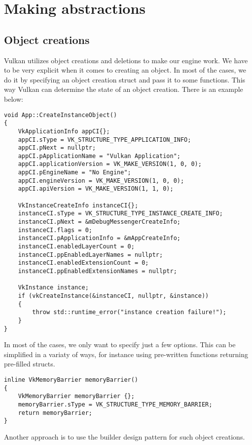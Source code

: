 \documentclass[12pt]{article}
\begin{document}
	\newpage
	\section{Making abstractions}
	\subsection{Object creations}
	Vulkan utilizes object creations and deletions to make our engine work. We have to be very explicit when it comes to creating an object. In most of the cases, we do it by specifying an object creation struct and pass it to some functions. This way Vulkan can determine the state of an object creation. There is an example below:
	\begin{lstlisting}[style=customcpp]
void App::CreateInstanceObject()
{
	VkApplicationInfo appCI{};
    appCI.sType = VK_STRUCTURE_TYPE_APPLICATION_INFO;
    appCI.pNext = nullptr;
    appCI.pApplicationName = "Vulkan Application";
    appCI.applicationVersion = VK_MAKE_VERSION(1, 0, 0);
    appCI.pEngineName = "No Engine";
    appCI.engineVersion = VK_MAKE_VERSION(1, 0, 0);
    appCI.apiVersion = VK_MAKE_VERSION(1, 1, 0);

	VkInstanceCreateInfo instanceCI{};
	instanceCI.sType = VK_STRUCTURE_TYPE_INSTANCE_CREATE_INFO;
	instanceCI.pNext = &mDebugMessengerCreateInfo;
    instanceCI.flags = 0;
    instanceCI.pApplicationInfo = &mAppCreateInfo;
    instanceCI.enabledLayerCount = 0;
    instanceCI.ppEnabledLayerNames = nullptr;
    instanceCI.enabledExtensionCount = 0;
    instanceCI.ppEnabledExtensionNames = nullptr;

	VkInstance instance;
	if (vkCreateInstance(&instanceCI, nullptr, &instance))
    {
        throw std::runtime_error("instance creation failure!");
    }
}
	\end{lstlisting}
	
	In most of the cases, we only want to specify just a few options. This can be simplified in a variaty of ways, for instance using pre-written functions returning pre-filled structs.
	\begin{lstlisting}[style=customcpp]
inline VkMemoryBarrier memoryBarrier()
{
	VkMemoryBarrier memoryBarrier {};
	memoryBarrier.sType = VK_STRUCTURE_TYPE_MEMORY_BARRIER;
	return memoryBarrier;
}
	\end{lstlisting}

	Another approach is to use the builder design pattern for such object creations.
\end{document}
